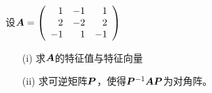 

\begin{li}
  设$\boldsymbol{A}=\left(
    \begin{array}{rrr}
      1&-1&1\\
      2&-2&2\\
      -1&1&-1
    \end{array}
  \right)$
  \begin{itemize}
  \item[(i)]求$\boldsymbol{A}$的特征值与特征向量
  \item[(ii)] 求可逆矩阵$\boldsymbol{P}$，使得$\boldsymbol{P}^{-1}\boldsymbol{A}\boldsymbol{P}$为对角阵。 
  \end{itemize}
\end{li}
